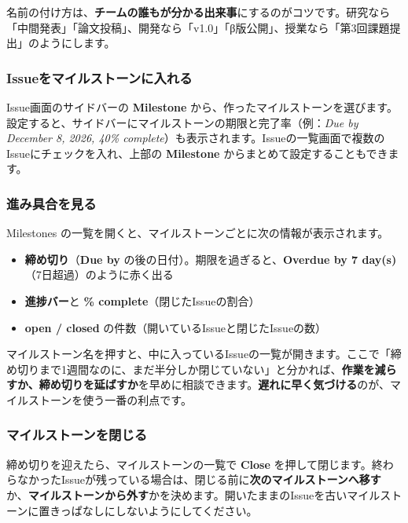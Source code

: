 名前の付け方は、\textbf{チームの誰もが分かる出来事}にするのがコツです。研究なら「中間発表」「論文投稿」、開発なら「v1.0」「β版公開」、授業なら「第3回課題提出」のようにします。

\subsubsection{Issueをマイルストーンに入れる}

Issue画面のサイドバーの \textbf{Milestone} から、作ったマイルストーンを選びます。設定すると、サイドバーにマイルストーンの期限と完了率（例：\textit{Due by December 8, 2026, 40\% complete}）も表示されます。Issueの一覧画面で複数のIssueにチェックを入れ、上部の \textbf{Milestone} からまとめて設定することもできます。

\subsubsection{進み具合を見る}

Milestones の一覧を開くと、マイルストーンごとに次の情報が表示されます。

\begin{itemize}[leftmargin=1.4em]
  \item \textbf{締め切り}（\textbf{Due by} の後の日付）。期限を過ぎると、\textbf{Overdue by 7 day(s)}（7日超過）のように赤く出る
  \item \textbf{進捗バー}と \textbf{\% complete}（閉じたIssueの割合）
  \item \textbf{open / closed} の件数（開いているIssueと閉じたIssueの数）
\end{itemize}

マイルストーン名を押すと、中に入っているIssueの一覧が開きます。ここで「締め切りまで1週間なのに、まだ半分しか閉じていない」と分かれば、\textbf{作業を減らすか、締め切りを延ばすか}を早めに相談できます。\textbf{遅れに早く気づける}のが、マイルストーンを使う一番の利点です。

\subsubsection{マイルストーンを閉じる}

締め切りを迎えたら、マイルストーンの一覧で \textbf{Close} を押して閉じます。終わらなかったIssueが残っている場合は、閉じる前に\textbf{次のマイルストーンへ移す}か、\textbf{マイルストーンから外す}かを決めます。開いたままのIssueを古いマイルストーンに置きっぱなしにしないようにしてください。

